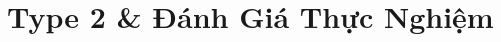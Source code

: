 \documentclass[aspectratio=169, xcolor=table]{beamer}
\begin{document}
\section{Type 2 \& Đánh Giá Thực Nghiệm}

\end{document}
